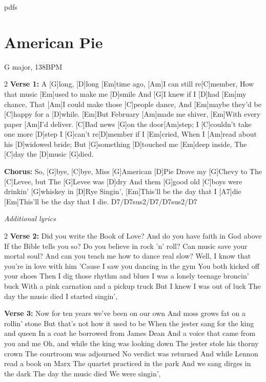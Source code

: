 pdfs\documentclass[../../../songbookMain]{subfiles}
\begin{document}
\section{American Pie}
{\tiny
G major, 138BPM
}

\begin{guitar}
\begin{multicols}{2}
  \textbf{Verse 1:}
  A [G]long, [D]long [Em]time ago, 
  [Am]I can still re[C]member,
  How that music [Em]used to make me [D]smile
  And [G]I knew if I [D]had [Em]my chance,
  That [Am]I could make those [C]people dance,
  And [Em]maybe they'd be [C]happy for a [D]while.
  [Em]But February [Am]made me shiver,
  [Em]With every paper [Am]I'd deliver.
  [C]Bad news [G]on the door[Am]step;
  I [C]couldn't take one more [D]step
  I [G]can't re[D]member if I [Em]cried,
  When I [Am]read about his [D]widowed bride;
  But [G]something [D]touched me [Em]deep inside,
  The [C]day the [D]music [G]died.

  \textbf{Chorus:}
  So, [G]bye, [C]bye, Miss [G]American [D]Pie
  Drove my [G]Chevy to The [C]Levee, but The [G]Levee was [D]dry
  And them [G]good old [C]boys were drinkin' [G]whiskey in [D]Rye
  Singin', [Em]This'll be the day that I [A7]die
  [Em]This'll be the day that I die.
  D7/D7sus2/D7/D7sus2/D7
\end{multicols}


\vspace{-5em}
\begin{center}
  \textit{Additional lyrics}
\end{center}
\tiny\flushleft
\vspace{-7em}
\begin{multicols}{2}
\textbf{Verse 2:}
Did you write the Book of Love?
And do you have faith in God above
If the Bible tells you so?
Do you believe in rock 'n' roll?
Can music save your mortal soul?
And can you teach me how to dance real slow?
Well, I know that you're in love with him
'Cause I saw you dancing in the gym
You both kicked off your shoes
Then I dig those rhythm and blues
I was a lonely teenage broncin' buck
With a pink carnation and a pickup truck
But I knew I was out of luck
The day the music died
I started singin', 

\textbf{Verse 3:}
Now for ten years we've been on our own
And moss grows fat on a rollin' stone
But that's not how it used to be
When the jester sang for the king and queen
In a coat he borrowed from James Dean
And a voice that came from you and me
Oh, and while the king was looking down
The jester stole his thorny crown
The courtroom was adjourned
No verdict was returned
And while Lennon read a book on Marx
The quartet practiced in the park
And we sang dirges in the dark
The day the music died
We were singin',


\end{multicols}
\end{guitar}
\end{document}
